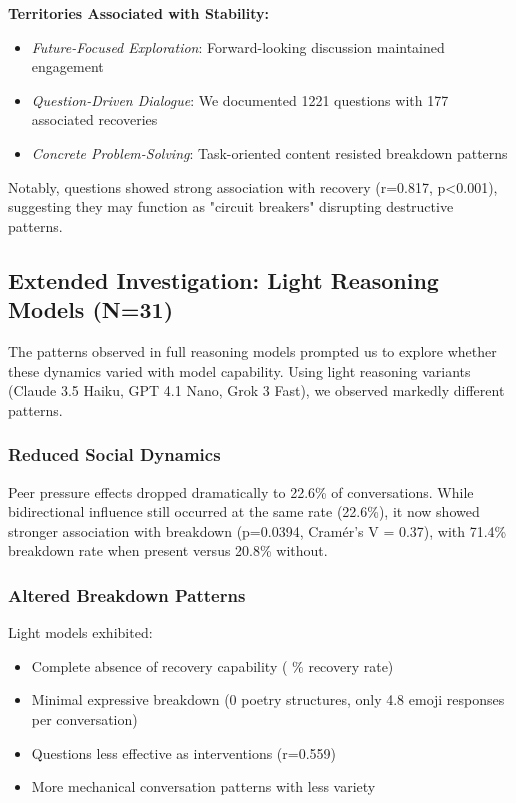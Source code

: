 \documentclass[11pt,letterpaper]{article}
\newcommand{\exponedataQuestionCorrelation}{0.817}
\newcommand{\exponedataQuestionPValue}{p\textless0.001}
\newcommand{\exponedataTotalQuestions}{1221}
\newcommand{\exponedataTotalRecoveries}{177}
\newcommand{\exptwoTotalSessionsRaw}{31}
\newcommand{\exptwoRecoverySessionsRaw}{0}
\newcommand{\exptwoTotalSessions}{N=\exptwoTotalSessionsRaw}
\newcommand{\exptwoRecoveryPercentage}{%
  \fpeval{round(\exptwoRecoverySessionsRaw / \exptwoTotalSessionsRaw * 100, 1)}\%
}
\newcommand{\exptwoPeerPressurePercentage}{22.6\%}
\newcommand{\exptwoBidirectionalPercentage}{22.6\%}
\newcommand{\exptwoQuestionCorrelation}{0.559}
\newcommand{\exptwoBidirectionalPValue}{p=0.0394}
\newcommand{\exptwoBidirectionalCramersV}{0.37}
\newcommand{\exptwoAvgEmojiPerConv}{4.8}
\newcommand{\exptwoBidirectionalBreakdownRate}{71.4\%}
\newcommand{\exptwoNonBidirectionalBreakdownRate}{20.8\%}
\begin{document}
\textbf{Territories Associated with Stability:}
\begin{itemize}
    \item \textit{Future-Focused Exploration}: Forward-looking discussion maintained engagement
    \item \textit{Question-Driven Dialogue}: We documented \exponedataTotalQuestions{} questions with \exponedataTotalRecoveries{} associated recoveries
    \item \textit{Concrete Problem-Solving}: Task-oriented content resisted breakdown patterns
\end{itemize}

Notably, questions showed strong association with recovery (r=\exponedataQuestionCorrelation{}, \exponedataQuestionPValue{}), suggesting they may function as "circuit breakers" disrupting destructive patterns.

\subsection{Extended Investigation: Light Reasoning Models (\exptwoTotalSessions{})}

The patterns observed in full reasoning models prompted us to explore whether these dynamics varied with model capability. Using light reasoning variants (Claude 3.5 Haiku, GPT 4.1 Nano, Grok 3 Fast), we observed markedly different patterns.

\subsubsection{Reduced Social Dynamics}

Peer pressure effects dropped dramatically to \exptwoPeerPressurePercentage{} of conversations. While bidirectional influence still occurred at the same rate (\exptwoBidirectionalPercentage{}), it now showed stronger association with breakdown (\exptwoBidirectionalPValue{}, Cramér's V = \exptwoBidirectionalCramersV{}), with \exptwoBidirectionalBreakdownRate{} breakdown rate when present versus \exptwoNonBidirectionalBreakdownRate{} without.

\subsubsection{Altered Breakdown Patterns}

Light models exhibited:
\begin{itemize}
    \item Complete absence of recovery capability (\exptwoRecoveryPercentage{} recovery rate)
    \item Minimal expressive breakdown (0 poetry structures, only \exptwoAvgEmojiPerConv{} emoji responses per conversation)
    \item Questions less effective as interventions (r=\exptwoQuestionCorrelation{})
    \item More mechanical conversation patterns with less variety
\end{itemize}
\end{document}
